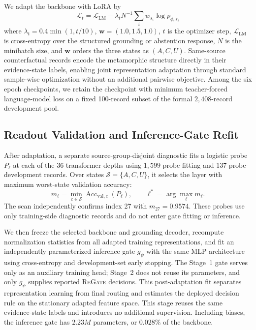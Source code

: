 \documentclass[letterpaper]{article}
\newcommand{\Method}{\textsc{ReGate}\xspace}
\begin{document}
We adapt the backbone with LoRA \citep{hu2022lora} by%
\begin{equation}
\mathcal L_t=\mathcal L_{\mathrm{LM}}
-\lambda_tN^{-1}\sum_i w_{s_i}\log p_{\phi,s_i}%
\label{eq:loss}
\end{equation}
where $\lambda_t=0.4\min(1,t/10)$, $\mathbf w=(1.0,1.5,1.0)$, $t$ is the optimizer step, $\mathcal L_{\mathrm{LM}}$ is cross-entropy over the structured grounding or abstention response, $N$ is the minibatch size, and $\mathbf w$ orders the three states as $(A,C,U)$. Same-source counterfactual records encode the metamorphic structure directly in their evidence-state labels, enabling joint representation adaptation through standard sample-wise optimization without an additional pairwise objective. Among the six epoch checkpoints, we retain the checkpoint with minimum teacher-forced language-model loss on a fixed 100-record subset of the formal $2{,}408$-record development pool.

\subsection{Readout Validation and Inference-Gate Refit}
\label{sec:probing}

After adaptation, a separate source-group-disjoint diagnostic fits a logistic probe $P_\ell$ at each of the 36 transformer depths using $1{,}599$ probe-fitting and 137 probe-development records. Over states $\mathcal S=\{A,C,U\}$, it selects the layer with maximum worst-state validation accuracy:
\begin{equation}
m_\ell=\min_{c\in\mathcal S}\operatorname{Acc}_{\mathrm{val},c}(P_\ell),
\qquad
\ell^*=\arg\max_\ell m_\ell .
\label{eq:layer_selection}
\end{equation}
The scan independently confirms index 27 with $m_{27}=0.9574$. These probes use only training-side diagnostic records and do not enter gate fitting or inference.

We then freeze the selected backbone and grounding decoder, recompute normalization statistics from all adapted training representations, and fit an independently parameterized inference gate $g_\psi$ with the same MLP architecture using cross-entropy and development-set early stopping. The Stage~1 gate serves only as an auxiliary training head; Stage~2 does not reuse its parameters, and only $g_\psi$ supplies reported \Method decisions. This post-adaptation fit separates representation learning from final routing and estimates the deployed decision rule on the stationary adapted feature space.
This stage reuses the same evidence-state labels and introduces no additional supervision. Including biases, the inference gate has $2.23M$
parameters, or $0.028\%$ of the backbone.
\end{document}
